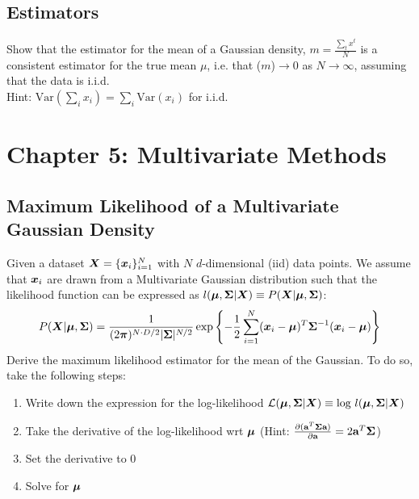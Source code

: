 \documentclass[11pt,a4paper]{article}
\begin{document}
\subsection{Estimators}
Show that the estimator for the mean of a Gaussian density, $m = \frac{\sum_t x^t}{N}$ is a consistent estimator for the true mean $\mu$, i.e. that ($m$)$\rightarrow 0$ as $N \rightarrow \infty$, assuming that the data is i.i.d. \\ Hint: $\text{Var}(\sum_i x_i) = \sum_i \text{Var}(x_i)$ for i.i.d.

\section{Chapter 5: Multivariate Methods}
\subsection{Maximum Likelihood of a Multivariate Gaussian Density}
Given a dataset $\boldsymbol{X} = \{\boldsymbol{x}_i \}_{i=1}^N$ with $N$ $d$-dimensional (iid) data points.
We assume that $\boldsymbol{x}_i$ are drawn from a Multivariate Gaussian distribution such that the likelihood function can be expressed as  $l(\boldsymbol{\mu}, \boldsymbol{\Sigma} | \boldsymbol{X}) \equiv P(\boldsymbol{X}|\boldsymbol{\mu}, \boldsymbol{\Sigma})$:
\begin{align}
	P(\boldsymbol{X}|\boldsymbol{\mu}, \boldsymbol{\Sigma}) =
	\frac{1}{(2\boldsymbol{\pi})^{N\cdot D/2} | \boldsymbol{\Sigma} |^{N/2}} \exp
	\left \{ -\frac{1}{2} \sum^N_{i=1} (\boldsymbol{x}_i -
	\boldsymbol{\mu})^T\boldsymbol{\Sigma}^{-1} (\boldsymbol{x}_i -
	\boldsymbol{\mu}) \right \} \label{eq:multivariate_likelihood}
\end{align}
Derive the maximum likelihood estimator for the mean of the Gaussian. To do so, take the following steps:
		\begin{enumerate}[(1)]
			\item Write down the expression for the log-likelihood $\mathcal{L}(\boldsymbol{\mu}, \boldsymbol{\Sigma}|\mathcal{\boldsymbol{X}}) \equiv \text{log }l(\boldsymbol{\mu}, \boldsymbol{\Sigma}|\boldsymbol{X})$
			\item Take the derivative of the log-likelihood wrt $\boldsymbol{\mu}$ (Hint: $\frac{\partial (\textbf{a}^T \boldsymbol{\Sigma} \textbf{a})}{\partial \textbf{a}} = 2 \textbf{a}^T \boldsymbol{\Sigma}$)
			\item Set the derivative to $0$
			\item Solve for $\boldsymbol{\mu}$
		\end{enumerate}
\end{document}
